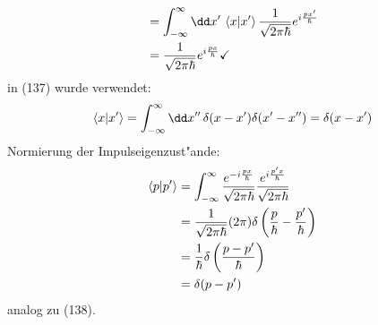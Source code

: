 \documentclass[a4paper]{scrartcl}
\begin{document}
{\begin{align}
\begin{split}
& = \int_{-\infty}^\infty \dd x' \, \braket{ x | x'} \frac1{\sqrt{2 \pi \hbar}} e^{i \frac {px'}\hbar} \\
& = \frac1{\sqrt{2\pi\hbar}} e^{i \frac{px}\hbar} \checkmark
\end{split}
\end{align}
in (137) wurde verwendet:
\begin{align}
\braket{x | x'} = \int_{-\infty}^\infty \dd x'' \, \delta(x - x') \delta(x' - x'') = \delta(x - x')
\end{align}
Normierung der Impulseigenzust"ande:
\begin{align}
\begin{split}
\braket{ p | p'} & = \int_{-\infty}^\infty \frac{ e^{- i \frac{px}\hbar}}{\sqrt{2 \pi \hbar}} \frac{e^{ i \frac{p'x}\hbar}}{\sqrt{2 \pi \hbar}} \\
& = \frac1{\sqrt{2\pi\hbar}} (2 \pi) \delta\left( \frac p \hbar - \frac {p'} \hbar \right) \\
& = \frac 1 \hbar \delta \left( \frac{ p - p'} \hbar \right) \\
& = \delta( p - p')
\end{split}
\end{align}
analog zu (138).

}
\end{document}
